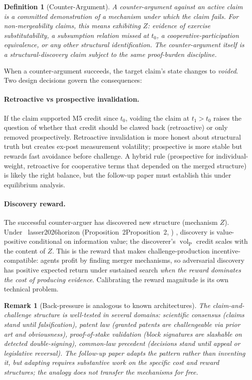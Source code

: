 \documentclass{article}
\makeatletter
\newcommand{\citep}[2][]{%
  \begingroup
  \def\@tmpkey{#2}%
  \ifx\@tmpkey\@empty\else
    (\ifx\@empty#1\@empty\else #1, \fi
     \@nameuse{bibkey@\@tmpkey})%
  \fi
  \endgroup
}
\newtheorem{definition}{Definition}
\newtheorem{remark}{Remark}
\DeclareMathOperator{\vol}{vol}
\newcommand{\volL}{{\vol_{\mathrm{P}}}}
\makeatother
\begin{document}
\begin{definition}[Counter-Argument]
\label{def:counter_argument}
A counter-argument against an active claim is a committed
demonstration of a mechanism under which the claim fails.  For
non-mergeability claims, this means exhibiting $Z$: evidence of
exercise substitutability, a subsumption relation missed at
$t_0$, a cooperative-participation equivalence, or any other
structural identification.  The counter-argument itself is a
structural-discovery claim subject to the same proof-burden
discipline.
\end{definition}

When a counter-argument succeeds, the target claim's state
changes to \emph{voided}.  Two design decisions govern the
consequences:

\paragraph{Retroactive vs prospective invalidation.}
If the claim supported M5 credit since $t_0$, voiding the claim
at $t_1 > t_0$ raises the question of whether that credit should
be clawed back (retroactive) or only removed prospectively.
Retroactive invalidation is more honest about structural truth
but creates ex-post measurement volatility; prospective is more
stable but rewards fast avoidance before challenge.  A hybrid
rule (prospective for individual-weight, retroactive for
cooperative terms that depended on the merged structure) is
likely the right balance, but the follow-up paper must establish
this under equilibrium analysis.

\paragraph{Discovery reward.}
The successful counter-arguer has discovered new structure
(mechanism $Z$).  Under~\citep[Proposition~2]{lasser2026horizon},
discovery is value-positive conditional on information value; the
discoverer's $\volL$ credit scales with the content of $Z$.  This
is the reward that makes challenge-production
incentive-compatible: agents profit by finding merger mechanisms,
so adversarial discovery has positive expected return under
sustained search \emph{when the reward dominates the cost of
producing evidence}.  Calibrating the reward magnitude is its
own technical problem.

\begin{remark}[Back-pressure is analogous to known architectures]
\label{rem:back_pressure_analogues}
The claim-and-challenge structure is well-tested in several
domains: scientific consensus (claims stand until falsification),
patent law (granted patents are challengeable via prior art and
obviousness), proof-of-stake validation (block signatures are
slashable on detected double-signing), common-law precedent
(decisions stand until appeal or legislative reversal).  The
follow-up paper adapts the pattern rather than inventing it,
but adapting requires substantive work on the specific cost and
reward structures; the analogy does not transfer the mechanisms
for free.
\end{remark}
\end{document}
